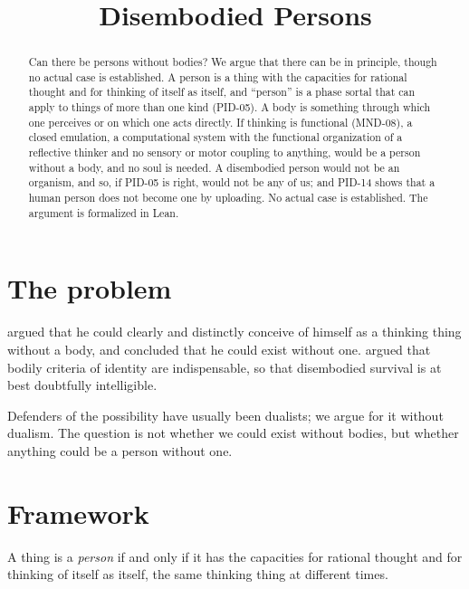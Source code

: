 \documentclass{situationist-preprint}
\title{Disembodied Persons}
\begin{document}
\maketitle

\begin{abstract}
Can there be persons without bodies? We argue that there can be in principle, though no actual case is established. A person is a thing with the capacities for rational thought and for thinking of itself as itself, and \enquote{person} is a phase sortal that can apply to things of more than one kind (PID-05). A body is something through which one perceives or on which one acts directly. If thinking is functional (MND-08), a closed emulation, a computational system with the functional organization of a reflective thinker and no sensory or motor coupling to anything, would be a person without a body, and no soul is needed. A disembodied person would not be an organism, and so, if PID-05 is right, would not be any of us; and PID-14 shows that a human person does not become one by uploading. No actual case is established. The argument is formalized in Lean.
\end{abstract}

\section{The problem}

\citet[VI]{Descartes1641} argued that he could clearly and distinctly conceive of himself as a thinking thing without a body, and concluded that he could exist without one. \citet{Penelhum1970} argued that bodily criteria of identity are indispensable, so that disembodied survival is at best doubtfully intelligible.

Defenders of the possibility have usually been dualists; we argue for it without dualism. The question is not whether we could exist without bodies, but whether anything could be a person without one.

\section{Framework}\label{s:frame}

\begin{definition}\label{d:person}
A thing is a \emph{person} if and only if it has the capacities for rational thought and for thinking of itself as itself, the same thinking thing at different times.
\end{definition}
\end{document}
